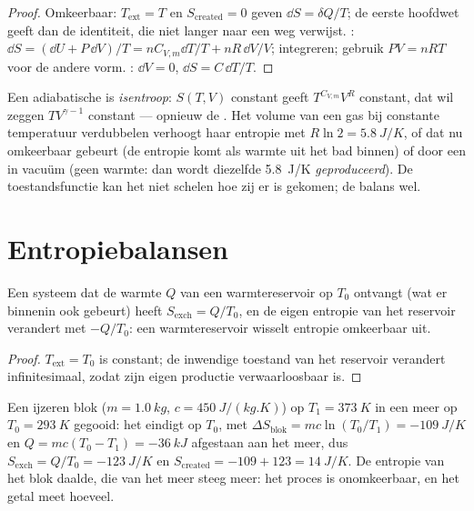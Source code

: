 \begin{proof}
Omkeerbaar: $T_{\mathrm{ext}} = T$ en $S_{\mathrm{created}} = 0$ geven $\dd S =
\delta Q/T$; de eerste hoofdwet geeft dan de identiteit, die niet langer
naar een weg verwijst. : $\dd S = (\dd U + P\,\dd V)/T = nC_{V,m}\dd T/T
+ nR\,\dd V/V$; integreren; gebruik $PV = nRT$ voor de andere vorm. : $\dd V = 0$, $\dd S = C\,\dd T/T$.
\end{proof}

\begin{example}\label{ex:b1:second-law-entropy:formulas}
Een adiabatische  is \emph{isentroop}: $S(T, V)$
constant geeft $T^{C_{V,m}}V^R$ constant, dat wil zeggen $TV^{\gamma - 1}$ constant ---
opnieuw de . Het volume van een  gas bij constante
temperatuur verdubbelen verhoogt haar entropie met $R\ln2 = \qty{5.8}{J/K}$, of dat nu
omkeerbaar gebeurt (de entropie komt als warmte uit het bad binnen) of door een
 in vacuüm (geen warmte: dan wordt diezelfde \qty{5.8}{J/K}
\emph{geproduceerd}). De toestandsfunctie kan het niet schelen hoe zij er is gekomen;
de balans wel.
\end{example}

\section{Entropiebalansen}

\begin{proposition}\label{prop:b1:second-law-entropy:thermostat}
Een systeem dat de warmte $Q$ van een warmtereservoir op $T_0$ ontvangt (wat er
binnenin ook gebeurt) heeft $S_{\mathrm{exch}} = Q/T_0$, en de eigen entropie van
het reservoir verandert met $-Q/T_0$: een warmtereservoir wisselt entropie omkeerbaar uit.
\end{proposition}

\begin{proof}
$T_{\mathrm{ext}} = T_0$ is constant; de inwendige toestand van het reservoir
verandert infinitesimaal, zodat zijn eigen productie verwaarloosbaar is.
\end{proof}

\begin{example}\label{ex:b1:second-law-entropy:quench}
Een ijzeren blok ($m = \qty{1.0}{kg}$, $c = \qty{450}{J/(kg.K)}$) op $T_1 =
\qty{373}{K}$ in een meer op $T_0 = \qty{293}{K}$ gegooid: het eindigt op $T_0$,
met $\Delta S_{\text{blok}} = mc\ln(T_0/T_1) = \qty{-109}{J/K}$ en $Q =
mc(T_0 - T_1) = \qty{-36}{kJ}$ afgestaan aan het meer, dus $S_{\mathrm{exch}} =
Q/T_0 = \qty{-123}{J/K}$ en $S_{\mathrm{created}} = -109 + 123 = \qty{+14}{J/K}$.
De entropie van het blok daalde, die van het meer steeg meer: het proces is
onomkeerbaar, en het getal meet hoeveel.
\end{example}

